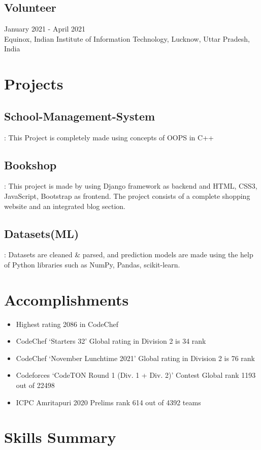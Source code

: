 \documentclass[12pt]{article}
\begin{document}
\subsection*{Volunteer}                         \hfill January 2021 - April 2021 \\   
Equinox, Indian Institute of Information Technology, Lucknow, Uttar Pradesh, India

\section*{Projects}
\subsection*{School-Management-System}: This Project is completely made using concepts of OOPS in C++ \\
\subsection*{Bookshop}: This project is made by using Django framework as backend and HTML, CSS3, JavaScript,
Bootstrap as frontend. The project consists of a complete shopping website and an integrated blog section. \\
\subsection*{Datasets(ML)}: Datasets are cleaned \& parsed, and prediction models are made using the help of Python
libraries such as NumPy, Pandas, scikit-learn.
\section*{Accomplishments}
\begin{itemize}
    \item Highest rating 2086 in CodeChef
\item CodeChef `Starters 32' Global rating in Division 2 is 34 rank
\item CodeChef `November Lunchtime 2021' Global rating in Division 2 is 76 rank
\item Codeforces `CodeTON Round 1 (Div. 1 + Div. 2)' Contest Global rank 1193 out of 22498
\item ICPC Amritapuri 2020 Prelims rank 614 out of 4392 teams
\end{itemize}
\section*{Skills Summary}
\end{document}
